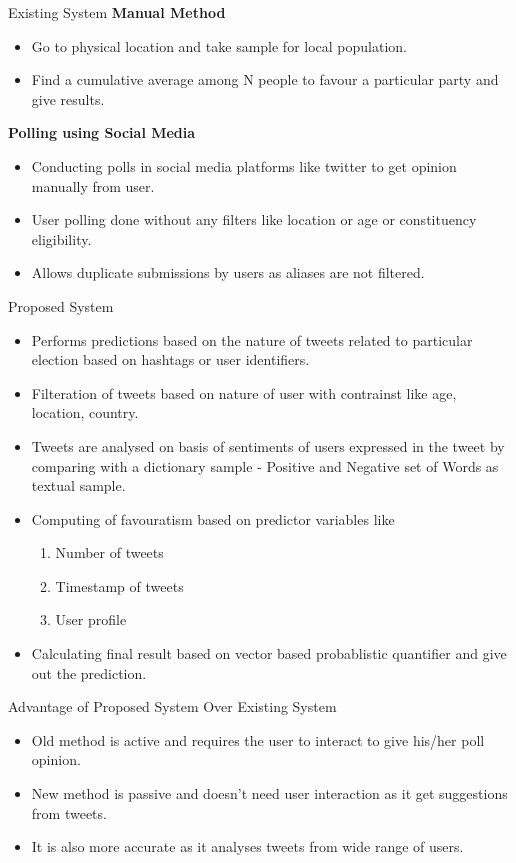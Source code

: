 \documentclass{beamer}
\begin{document}
\begin{frame}{Existing System}
	\textbf{Manual Method}
	\begin{itemize}
		\item Go to physical location and take sample for local population.
		\item Find a cumulative average among N people to favour a particular party and give results.
	\end{itemize}
	\textbf{Polling using Social Media}
	\begin{itemize}
		\item Conducting polls in social media platforms like twitter to get opinion manually from user.
		\item User polling done without any filters like location or age or constituency eligibility.
		\item Allows duplicate submissions by users as aliases are not filtered.
	\end{itemize}
\end{frame}

\begin{frame}{Proposed System}
	\begin{itemize}
		\item Performs predictions based on the nature of tweets related to particular election based on hashtags or user identifiers.
		\item Filteration of tweets based on nature of user with contrainst like age, location, country.
		\item Tweets are analysed on basis of sentiments of users expressed in the tweet by comparing with a dictionary sample - Positive and Negative set of Words as textual sample.
		\item Computing of favouratism based on predictor variables like
			\begin{enumerate}
				\item Number of tweets
				\item Timestamp of tweets
				\item User profile
			\end{enumerate}
		\item Calculating final result based on vector based probablistic quantifier and give out the prediction.
	\end{itemize}
\end{frame}

\begin{frame}{Advantage of Proposed System Over Existing System}
	\begin{itemize}
		\item Old method is active and requires the user to interact to give his/her poll opinion.
		\item New method is passive and doesn't need user interaction as it get suggestions from tweets.
		\item It is also more accurate as it analyses tweets from wide range of users.
	\end{itemize}
\end{frame}
\end{document}
